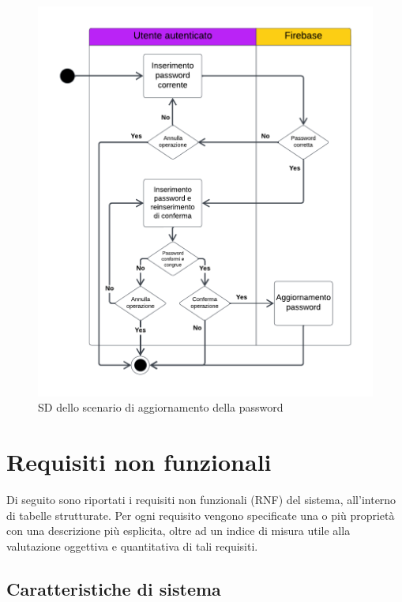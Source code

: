 \documentclass[11pt, a4paper]{article}
\theoremstyle{definition} %
\begin{document}
\begin{figure}[H]
\centering
\hspace*{-0.7cm}
\includegraphics[scale = 0.95]{materiale/ucdiagrams/swimlanepassword.pdf}
\caption{SD dello scenario di aggiornamento della password}
\label{slpassword}
\end{figure}


\newpage
\section{Requisiti non funzionali}
Di seguito sono riportati i requisiti non funzionali (RNF)
del sistema, all'interno di tabelle strutturate. Per ogni requisito vengono
specificate una o più proprietà con una descrizione più esplicita,
oltre ad un indice di misura utile alla valutazione oggettiva
e quantitativa di tali requisiti.

\subsection{Caratteristiche di sistema}
\end{document}
